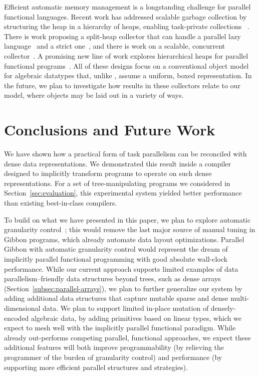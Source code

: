 \documentclass[acmsmall,acmthm=false,nonacm]{acmart}
\theoremstyle{straighttext0}
\theoremstyle{straighttext}
\newcommand{\Secref}[1]{Section~\ref{#1}}
\begin{document}
{Efficient automatic memory management is a longstanding challenge for parallel functional
languages.
%
Recent work has addressed scalable garbage collection by structuring
the heap in a hierarchy of heaps, enabling task-private collections
~\cite{hierarchical-heaps-mutation}. There is work proposing a
split-heap collector that can handle a parallel lazy
language~\cite{marlow2009runtime} and a strict
one~\cite{multicore-ocaml}, and there is work on a
scalable, concurrent collector~\cite{ueno2016fully}.
%
A promising new line of work explores hierarchical heaps for parallel
functional programs~\cite{icfp-hierarchical-heaps}.
%
All of these designs focus on a conventional object model for algebraic datatypes that, unlike \rparcalc{},
assume a uniform, boxed representation.
%
In the future, we plan to investigate how results in these collectors relate to our model,
where objects may be laid out in a variety of ways.


\section{Conclusions and Future Work}
\label{sec:conclusions}

We have shown how a practical form of task parallelism can be reconciled with
dense data representations.  We demonstrated this result inside a compiler
designed to implicitly transform programs to operate on such dense
representations.  For a set of tree-manipulating programs we considered in
\Secref{sec:evaluation}, this experimental system yielded better performance
than existing best-in-class compilers.

To build on what we have presented in this paper, we plan to explore automatic
granularity control~\cite{Heartbeat_17,OracleGuided_19}; this would remove the
last major source of manual tuning in Gibbon programs,
which already automate data layout optimizations.
Parallel Gibbon with
automatic granularity control would represent the dream of implicitly parallel
functional programming with good absolute wall-clock performance.
%
While our current approach supports limited examples of data parallelism--friendly data structures beyond trees, such as dense arrays (\Secref{subsec:parallel-arrays}), we plan to further generalize our system by adding additional data structures that capture mutable sparse and dense multi-dimensional data.
%
%
We plan to support limited in-place mutation of densely-encoded algebraic data, by adding primitives based on linear types, which we expect to mesh well with the implicitly parallel functional paradigm.
%
While \pargibbon{} already out-performs competing parallel, functional approaches, we expect these additional features will both improve programmability (by relieving the programmer of the burden of granularity control) and performance (by supporting more efficient parallel structures and strategies).


}
\end{document}
